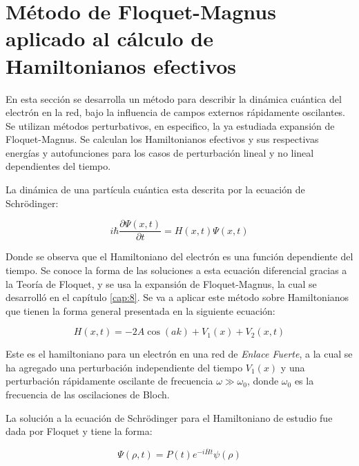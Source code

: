 \chapter{Método de Floquet-Magnus aplicado al cálculo de Hamiltonianos efectivos}\label{cap:10}

En esta sección se desarrolla un método para describir la dinámica cuántica del electrón en la red, bajo la influencia de campos externos rápidamente oscilantes. Se utilizan métodos perturbativos, en especifico, la ya estudiada expansión de Floquet-Magnus. Se calculan los Hamiltonianos efectivos y sus respectivas energías y autofunciones para los casos de perturbación lineal y no lineal dependientes del tiempo. 

La dinámica de una partícula cuántica esta descrita por la ecuación de Schrödinger:

\begin{equation}\label{eq:10.1}
    i\hbar\frac{\partial \Psi(x,t)}{\partial t}=H(x,t)\Psi(x,t)
\end{equation}

Donde se observa que el Hamiltoniano del electrón es una función dependiente del tiempo. Se conoce la forma de las soluciones a esta ecuación diferencial gracias a la Teoría de Floquet, y se usa la expansión de Floquet-Magnus, la cual se desarrolló en el capítulo \ref{cap:8}. Se va a aplicar este método sobre Hamiltonianos que tienen la forma general presentada en la siguiente ecuación: 

\begin{equation}\label{eq:10.2}
    H(x,t)=-2A\cos(ak)+V_1(x)+V_2(x,t)
\end{equation}

Este es el hamiltoniano para un electrón en una red de \textit{Enlace Fuerte}, a la cual se ha agregado una perturbación independiente del tiempo $V_1(x)$ y una perturbación rápidamente oscilante de frecuencia $\omega \gg \omega_0$, donde $\omega_0$ es la frecuencia de las oscilaciones de Bloch.

La solución a la ecuación de Schrödinger para el Hamiltoniano de estudio fue dada por Floquet y tiene la forma:

\begin{equation}\label{eq:10.3}
    \Psi(\rho,t)=P(t)e^{-i\overline{H}t}\psi(\rho)
\end{equation}


